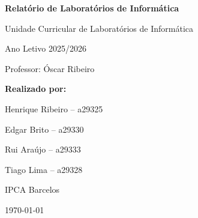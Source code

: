 \begin{titlepage}
\centering

\vspace*{2cm}

{\Huge\bfseries Relatório de Laboratórios de Informática\par}

\vspace{1.5cm}

{\Large Unidade Curricular de Laboratórios de Informática\par}

\vspace{1cm}

{\large Ano Letivo 2025/2026\par}

\vspace{1cm}

{\large Professor: Óscar Ribeiro\par}

\vfill

{\Large\bfseries Realizado por:\par}
\vspace{0.5cm}

{\large
Henrique Ribeiro -- a29325\par
Edgar Brito -- a29330\par
Rui Araújo -- a29333\par
Tiago Lima -- a29328\par
}

\vspace{1.5cm}

{\large IPCA Barcelos\par}

\vspace{0.5cm}

{\large \today\par}

\end{titlepage}